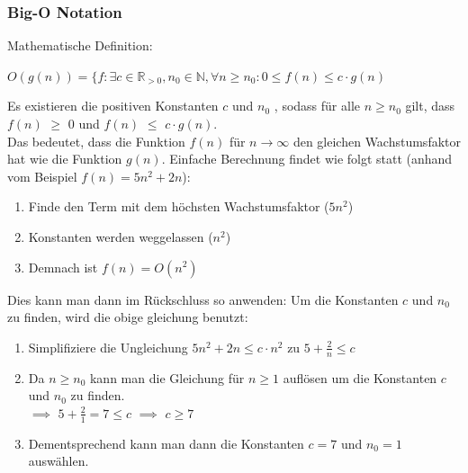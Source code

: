 \documentclass[
../../AuD-Zusammenfassung.tex,
]
{subfiles}
\begin{document}
\subsubsection{Big-O Notation}
Mathematische Definition: 
\begin{center}
    $O(g(n)) = \{f: \exists c \in \mathbb{R}_{>0}, n_0 \in \mathbb{N}, \forall n \geq n_0:  0 \leq f(n) \leq c \cdot g(n)$
\end{center}
Es existieren die positiven Konstanten $c$ und $n_0$ , sodass für alle $n \geq n_0$ gilt, dass  $f(n)$ $\geq$ 0 und $f(n)$ $\leq$ $c \cdot g(n)$. \\
Das bedeutet, dass die Funktion $f(n)$ für $n \to \infty$ den gleichen Wachstumsfaktor hat wie die Funktion $g(n)$.
Einfache Berechnung findet wie folgt statt (anhand vom Beispiel $f(n) = 5n^2 + 2n$):
\begin{enumerate}
    \item Finde den Term mit dem höchsten Wachstumsfaktor ($5n^2$)
    \item Konstanten werden weggelassen ($n^2$)
    \item Demnach ist $f(n) = O(n^2)$
\end{enumerate}
Dies kann man dann im Rückschluss so anwenden:
Um die Konstanten $c$ und $n_0$ zu finden, wird die obige gleichung benutzt:
\begin{enumerate}
    \item Simplifiziere die Ungleichung $5n^2 + 2n \leq c \cdot n^2$ zu $5 + \frac{2}{n} \leq c$
    \item Da $n \geq n_0$ kann man die Gleichung für $n \geq 1$ auflösen um die Konstanten $c$ und $n_0$ zu finden. \\
    $\implies$ $5 + \frac{2}{1} = 7 \leq c$ $\implies$ $c \geq 7$
    \item Dementsprechend kann man dann die Konstanten $c = 7$ und $n_0 = 1$ auswählen.
\end{enumerate}

\newpage
\end{document}

